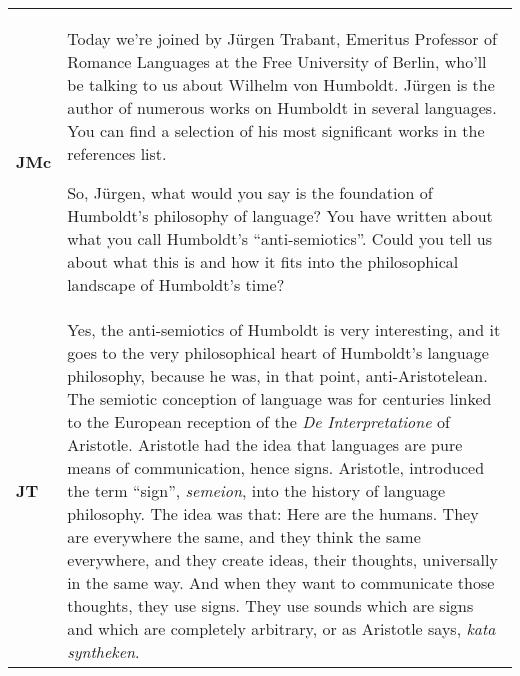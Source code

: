 \documentclass[12pt]{article}
\begin{document}
\begin{flushleft}
\tablefirsthead{}
\tablehead{}
\tabletail{}
\tablelasttail{}
\begin{supertabular}{m{0.24415985in}m{5.89766in}}
\textbf{JMc}\newline
 &
Today we’re joined by Jürgen Trabant, Emeritus Professor of Romance Languages at the Free University of Berlin, who’ll be talking to us about Wilhelm von Humboldt. Jürgen is the author of numerous works on Humboldt in several languages. You can find a selection of his most significant works in the references list.

So, Jürgen, what would you say is the foundation of Humboldt’s philosophy of language? You have written about what you call Humboldt’s “anti-semiotics”. Could you tell us about what this is and how it fits into the philosophical landscape of Humboldt’s time?\\
\textbf{JT}\newline
 &
Yes, the anti-semiotics of Humboldt is very interesting, and it goes to the very philosophical heart of Humboldt’s language philosophy, because he was, in that point, anti-Aristotelean. The semiotic conception of language was for centuries linked to the European reception of the \textit{De Interpretatione} of Aristotle. Aristotle had the idea that languages are pure means of communication, hence signs. Aristotle, introduced the term “sign”, \textit{semeion}, into the history of language philosophy. The idea was that: Here are the humans. They are everywhere the same, and they think the same everywhere, and they create ideas, their thoughts, universally in the same way. And when they want to communicate those thoughts, they use signs. They use sounds which are signs and which are completely arbitrary, or as Aristotle says, \textit{kata syntheken}. 


\end{supertabular}
\end{flushleft}
\end{document}
